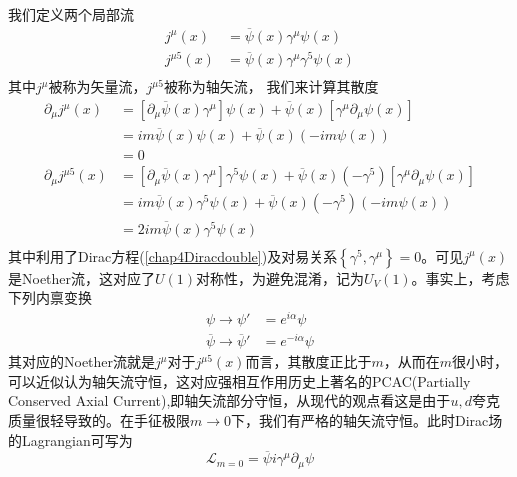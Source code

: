 我们定义两个局部流
\begin{equation}
\begin{aligned}
  j^{\mu}(x)&=\overline{\psi}(x)\gamma^{\mu}\psi(x)\\
  j^{\mu5}(x)&=\overline{\psi}(x)\gamma^{\mu}\gamma^{5}\psi(x)\\
  \end{aligned}
\end{equation}
其中$j^{\mu}$被称为矢量流，$j^{\mu5}$被称为轴矢流，
我们来计算其散度
\begin{equation}
    \begin{aligned}
      \partial_{\mu}j^{\mu}(x)&=\left[\partial_{\mu}\overline{\psi}(x)\gamma^{\mu}\right]\psi(x)+\overline{\psi}(x)\left[\gamma^{\mu}\partial_{\mu}{\psi}(x)\right]\\
      &=im\overline{\psi}(x)\psi(x)+\overline{\psi}(x)(-im\psi(x))\\
      &=0\\
      \partial_{\mu}j^{\mu5}(x)&=\left[\partial_{\mu}\overline{\psi}(x)\gamma^{\mu}\right]\gamma^{5}\psi(x)+\overline{\psi}(x)(-\gamma^{5})\left[\gamma^{\mu}\partial_{\mu}{\psi}(x)\right]\\
      &=im\overline{\psi}(x)\gamma^{5}\psi(x)+\overline{\psi}(x)(-\gamma^{5})(-im\psi(x))\\
      &=2im\overline{\psi}(x)\gamma^{5}\psi(x)\\
    \end{aligned}
\end{equation}
其中利用了Dirac方程(\ref{chap4Diracdouble})及对易关系$\left\{\gamma^{5},\gamma^{\mu}\right\}=0$。可见$j^{\mu}(x)$是Noether流，这对应了$U(1)$对称性，为避免混淆，记为$U_{V}(1)$。事实上，考虑下列内禀变换
\begin{equation}
    \begin{aligned}
    \psi\longrightarrow\psi'&=e^{i\alpha}\psi\\
     \overline{\psi}\longrightarrow\overline{\psi}'&=e^{-i\alpha}\psi
    \end{aligned}
\end{equation}
其对应的Noether流就是$j^{\mu}$对于$j^{\mu5}(x)$而言，其散度正比于$m$，从而在$m$很小时，可以近似认为轴矢流守恒，这对应强相互作用历史上著名的PCAC(Partially Conserved Axial Current),即轴矢流部分守恒，从现代的观点看这是由于$u,d$夸克质量很轻导致的。在手征极限$m\rightarrow0$下，我们有严格的轴矢流守恒。此时Dirac场的Lagrangian可写为
\begin{equation}
    \mathcal{L}_{m=0}=\overline{\psi}i\gamma^{\mu}\partial_{\mu}\psi
\end{equation}
